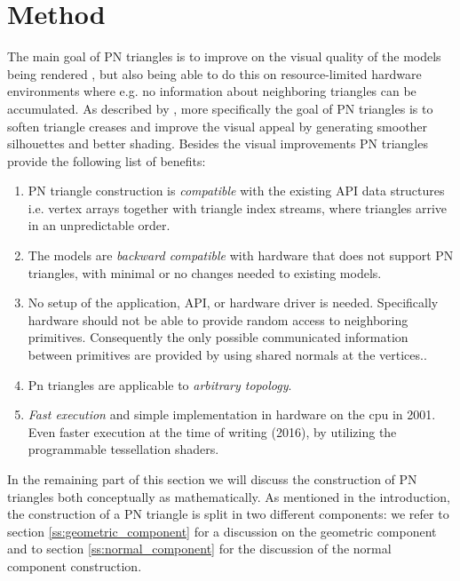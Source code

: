 
\section{Method}
\label{s:method}


The main goal of PN triangles is to improve on the visual quality of the models being rendered , but also being able to do this on resource-limited hardware environments where e.g. no information about neighboring triangles can be accumulated. As described by \citeauthor{vlachos2001curved}, more specifically the goal of PN triangles is to soften triangle creases and improve the visual appeal by generating smoother silhouettes and better shading. Besides the visual improvements PN triangles provide the following list of benefits:

\begin{enumerate}
 	\item PN triangle construction is \textit{compatible} with the existing API data structures i.e. vertex arrays together with triangle index streams, where triangles arrive in an unpredictable order.
 	\item The models are \textit{backward compatible} with hardware that does not support PN triangles, with minimal or no changes needed to existing models.
 	\item No setup of the application, API, or hardware driver is needed. Specifically hardware should not be able to provide random access to neighboring primitives. Consequently the only possible communicated information between primitives are provided by using shared normals at the vertices..
 	\item Pn triangles are applicable to \textit{arbitrary topology}.
 	\item \textit{Fast execution} and simple implementation in hardware on the cpu in 2001. Even faster execution at the time of writing (2016), by utilizing the programmable tessellation shaders.
 \end{enumerate} 

In the remaining part of this section we will discuss the construction of PN triangles both conceptually as mathematically. As mentioned in the introduction, the construction of a PN triangle is split in two different components: we refer to section \ref{ss:geometric_component} for a discussion on the geometric component and to section \ref{ss:normal_component} for the discussion of the normal component construction. 






